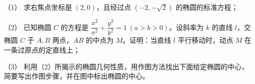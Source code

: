 \begin{question}

（1） 求右焦点坐标是 $(2,0)$，且经过点 $(-2,-\sqrt2)$ 的椭圆的标准方程；

（2） 已知椭圆 $C$ 的方程是 $\dfrac{x^2}{a^2}+\dfrac{y^2}{b^2}=1\ (a>b>0)$。设斜率为 $k$ 的直线 $l$，交椭圆 $C$ 于 $A,B$ 两点，$AB$ 的中点为 $M$。证明：当直线 $l$ 平行移动时，动点 $M$ 在一条过原点的定直线上；

（3） 利用（2）所揭示的椭圆几何性质，用作图方法找出下面给定椭圆的中心，简要写出作图步骤，并在图中标出椭圆的中心。
\nopagebreak[4]
\begin{center}\end{center}
\nopagebreak[4]

\end{question}